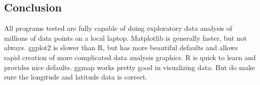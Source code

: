 \documentclass[]{article}
\begin{document}
\subsection{Conclusion}\label{conclusion}

All programs tested are fully capable of doing exploratory data analysis
of millions of data points on a local laptop. Matplotlib is generally
faster, but not always. ggplot2 is slower than R, but has more beautiful
defaults and allows rapid creation of more complicated data analysis
graphics. R is quick to learn and provides nice defaults. ggmap works
pretty good in visualizing data. But do make sure the longitude and
latitude data is correct.
\end{document}
